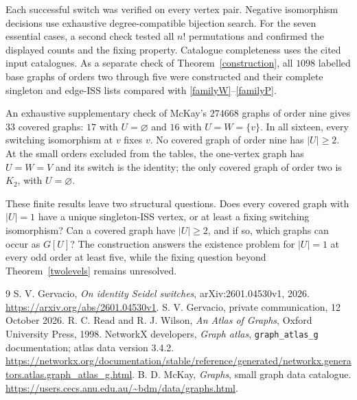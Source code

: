 \documentclass[11pt]{article}
\begin{document}
Each successful switch was verified on every vertex pair. Negative
isomorphism decisions use exhaustive degree-compatible bijection search.
For the seven essential cases, a second check tested all $n!$ permutations
and confirmed the displayed counts and the fixing property. Catalogue
completeness uses the cited input catalogues. As a separate check of
Theorem~\ref{construction}, all $1098$ labelled base graphs of orders two
through five were constructed and their complete singleton and edge-ISS
lists compared with \eqref{familyW}--\eqref{familyP}.

An exhaustive supplementary check of McKay's $274668$ graphs of order
nine gives $33$ covered graphs: $17$ with $U=\varnothing$ and $16$ with
$U=W=\{v\}$. In all sixteen, every switching isomorphism at $v$ fixes
$v$. No covered graph of order nine has $|U|\geq2$. At the small orders
excluded from the tables, the one-vertex graph has $U=W=V$ and its
switch is the identity; the only covered graph of order two is $K_2$,
with $U=\varnothing$.

\newpage
These finite results leave two structural questions. Does every covered
graph with $|U|=1$ have a unique singleton-ISS vertex, or at least a fixing
switching isomorphism? Can a covered graph have $|U|\geq2$, and if so,
which graphs can occur as $G[U]$? The construction answers the existence
problem for $|U|=1$ at every odd order at least five, while the
fixing question beyond Theorem~\ref{twolevels} remains unresolved.

\begin{thebibliography}{9}
 S. V. Gervacio, \emph{On identity Seidel switches},
arXiv:2601.04530v1, 2026. \url{https://arxiv.org/abs/2601.04530v1}.
 S. V. Gervacio, private communication,
12 October 2026.
 R. C. Read and R. J. Wilson, \emph{An Atlas of Graphs},
Oxford University Press, 1998.
 NetworkX developers, \emph{Graph atlas},
\texttt{graph\_atlas\_g} documentation; atlas data version 3.4.2.
\url{https://networkx.org/documentation/stable/reference/generated/networkx.generators.atlas.graph_atlas_g.html}.
 B. D. McKay, \emph{Graphs}, small graph data catalogue.
\url{https://users.cecs.anu.edu.au/~bdm/data/graphs.html}.
\end{thebibliography}
\end{document}

